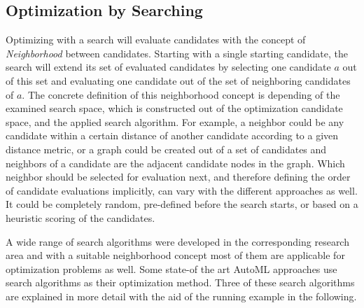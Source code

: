 \subsection{Optimization by Searching}
\label{sec:theory:optimization:search}
Optimizing with a search will evaluate candidates with the concept of \textit{Neighborhood} between candidates.
Starting with a single starting candidate, the search will extend its set of evaluated candidates by selecting one candidate $a$ out of this set and evaluating one candidate out of the set of neighboring candidates of $a$.\newline
The concrete definition of this neighborhood concept is depending of the examined search space, which is constructed out of the optimization candidate space, and the applied search algorithm.
For example, a neighbor could be any candidate within a certain distance of another candidate according to a given distance metric, or a graph could be created out of a set of candidates and neighbors of a candidate are the adjacent candidate nodes in the graph.\newline
Which neighbor should be selected for evaluation next, and therefore defining the order of candidate evaluations implicitly, can vary with the different approaches as well.
It could be completely random, pre-defined before the search starts, or based on a heuristic scoring of the candidates.

A wide range of search algorithms were developed in the corresponding research area and with a suitable neighborhood concept most of them are applicable for optimization problems as well.
Some state-of the art AutoML approaches use search algorithms as their optimization method.
Three of these search algorithms are explained in more detail with the aid of the running example in the following.

